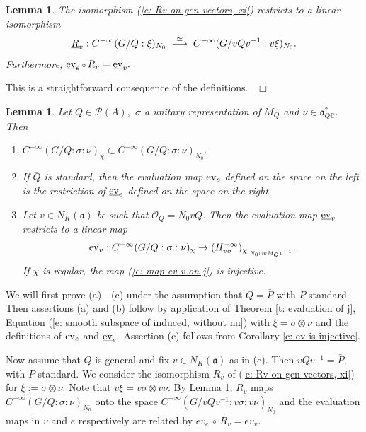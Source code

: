 \documentclass[12pt,a4paper]{article}
\newtheorem{Lemma}[Thm]{Lemma}
\newenvironment{lemma}[0]{\begin{Lemma}\noindent}%
{\end{Lemma}}
\def\proof{\par\noindent{\it Proof.}{\ }{\ }}
\def\qed{~\hfill\hbox{$\Box$}\medbreak}
\def\itema{\vspace{-1mm}\item[{\rm (a)}]}
\def\itemb{\item[{\rm (b)}]}
\def\itemc{\item[{\rm (c)}]}
\def\msy#1{{\mathbb #1}}
\def\C{{\msy C}}
\def\gs{\sigma}
\def\got#1{\mathfrak #1}
\def\fa{{\got a}}
\def\to{\rightarrow}
\def\after{\,{\scriptstyle\circ}\,}
\def\iC{{\scriptscriptstyle \C}}
\def\cO{{\mathcal O}}
\def\cP{{\mathcal P}}
\numberwithin{Thm}{section}
\numberwithin{equation}{section}
\def\ev{{\rm ev}}
\numberwithin{equation}{section}
\def\faQdc{\fa_{Q\iC}^*}
\def\cchi{\chi}
\begin{document}
\begin{lemma}
\label{l: Nzero space invariant under Rv}
The isomorphism (\ref{e: Rv on gen vectors, xi}) restricts to a linear isomorphism
$$ 
\underline R_v:  C^{-\infty}(G/Q: \xi)_{N_0} \;\; {\buildrel \simeq \over \longrightarrow} \;\; C^{-\infty}(G/vQv^{-1}: v\xi)_{N_0}.
$$ 
Furthermore, $ \underline \ev_e \after R_v = \underline \ev_v .$
\end{lemma}

\proof 
This is a straightforward consequence of the definitions.
\qed

%
\begin{lemma} 
\label{l: ev and ev}
Let $Q \in\cP(A),$ $\gs$ a unitary representation of $M_Q$ and $\nu \in \faQdc.$ 
Then
\begin{enumerate}
\itema  
$
C^{-\infty}(G/ Q:\gs: \nu)_\cchi \subset  C^{-\infty}(G/Q: \gs: \nu)_{N_0}.
$ 
\itemb
If $\bar Q$ is standard, then the evaluation map $\ev_e$ defined on the space on the left is the restriction of $\underline\ev_e$ defined on the space on the right.
\itemc
Let $v\in N_K(\fa)$ be such that $\cO_Q= N_0 v Q .$ Then the evaluation map $\underline \ev_v$ 
restricts to a linear map
\begin{equation}
\label{e: map ev v on j}
\ev_v: C^{-\infty}(G/ Q:\gs: \nu)_\cchi  \to (H_{v\gs}^{- \infty})_{\cchi|_{N_0 \cap v M_Q v^{-1}}}.
 \end{equation}
 If $\cchi$ is regular, the map (\ref{e: map ev v on j})
is injective.
\end{enumerate}
\end{lemma}

\proof
We will first prove (a) - (c) under the assumption that  $Q =\bar P$ with 
$P$ standard. Then assertions (a) and (b) follow by application of 
Theorem \ref{t: evaluation of j}, Equation (\ref{e: smooth subspace of induced, without nu})
with $\xi = \gs \otimes \nu$
and the definitions of $\ev_e $ and $\underline \ev_e.$ Assertion (c) follows
from Corollary \ref{c: ev is injective}.

Now assume that 
$Q$ is general and fix $v \in N_K(\fa)$ as in (c). Then $vQv^{-1} = \bar P,$ 
with $P$ standard. We consider the isomorphism $R_v$ of (\ref{e: Rv on gen vectors, xi})
for $\xi:= \gs\otimes \nu.$ Note that $v\xi = v\gs \otimes v\nu.$ 
By Lemma \ref{l: Nzero space invariant under Rv}, 
 $R_v$ maps $C^{-\infty}(G/Q: \gs : \nu)_{N_0}$ 
onto the space $C^{-\infty}(G/vQv^{-1}: v\gs : v \nu)_{N_0}$ and the evaluation maps 
in $v$ and $e$ respectively are related by 
$\underline ev_e \after R_{v}= \underline ev_v.$
\end{document}
